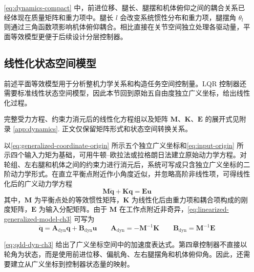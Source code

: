 \eqref{eq:dynamics-compact} 中，前进位移、腿长、腿摆和机体俯仰之间的耦合关系已经体现在质量矩阵和重力项中。腿长 $l$ 会改变系统惯性分布和重力项，腿摆角 $\theta_l$ 则通过三角函数项影响机体俯仰耦合。相比直接在关节空间独立处理各驱动量，平面等效模型更便于后续设计分层控制器。

\subsection{线性化状态空间模型}\label{sec:state-space-model}

前述平面等效模型用于分析整机力学关系和构造任务空间控制量。LQR 控制器还需要标准线性状态空间模型，因此本节回到原始五自由度独立广义坐标，给出线性化过程。

完整受力方程、约束力消元后的线性化方程组以及矩阵 $\boldsymbol{M}$、$\boldsymbol{K}$、$\boldsymbol{E}$ 的展开式见附录 \ref{app:dynamics}. 正文仅保留矩阵形式和状态空间转换关系。

以\eqref{eq:generalized-coordinate-origin} 所示五个独立广义坐标和\eqref{eq:input-origin} 所示四个输入力矩为基础，可用牛顿--欧拉法或拉格朗日法建立原始动力学方程。对轮组、左右腿和机体之间的约束力进行消元后，系统可写成只含独立广义坐标的二阶动力学形式。在直立平衡点附近作小角度近似，并忽略高阶非线性项，可得线性化后的广义动力学方程
\begin{equation}
  \boldsymbol{M}\ddot{\boldsymbol{q}} + \boldsymbol{K}\boldsymbol{q} = \boldsymbol{E}\boldsymbol{u}
  \label{eq:linearized-generalized-model-ch3}
\end{equation}
其中，$\boldsymbol{M}$ 为平衡点处的等效惯性矩阵，$\boldsymbol{K}$ 为线性化后由重力项和耦合项构成的刚度矩阵，$\boldsymbol{E}$ 为输入分配矩阵。由于 $\boldsymbol{M}$ 在工作点附近非奇异，\eqref{eq:linearized-generalized-model-ch3} 可写为
\begin{equation}
  \ddot{\boldsymbol{q}}
  =
  \boldsymbol{A}_{\mathrm{dyn}}\boldsymbol{q}
  +
  \boldsymbol{B}_{\mathrm{dyn}}\boldsymbol{u}
  \qquad
  \boldsymbol{A}_{\mathrm{dyn}} = -\boldsymbol{M}^{-1}\boldsymbol{K}
  \qquad
  \boldsymbol{B}_{\mathrm{dyn}} = \boldsymbol{M}^{-1}\boldsymbol{E}
  \label{eq:qdd-dyn-ch3}
\end{equation}

\eqref{eq:qdd-dyn-ch3} 给出了广义坐标空间中的加速度表达式。第四章控制器不直接以轮角为状态，而是使用前进位移、偏航角、左右腿摆角和机体俯仰角。因此，还需要建立从广义坐标到控制器状态量的映射。

